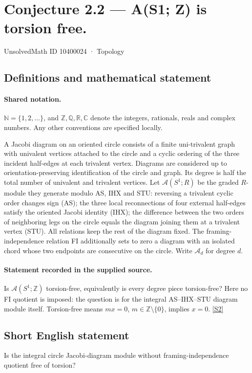 \documentclass[11pt]{article}
\newcommand{\sref}[2]{\hyperlink{source:#1:#2}{[S#2]}}
\begin{document}
\setcounter{section}{10400023}
\section{Conjecture 2.2 — A(S1; Z) is torsion free.}\label{10400024}
{\small\sffamily UnsolvedMath ID 10400024 · Topology}
\subsection{Definitions and mathematical statement}

\paragraph{Shared notation.}$\mathbb N=\{1,2,\ldots\}$, and $\mathbb Z,\mathbb Q,\mathbb R,\mathbb C$ denote the integers, rationals, reals and complex numbers. Any other conventions are specified locally.


A Jacobi diagram on an oriented circle consists of a finite uni-trivalent graph with univalent vertices attached to the circle and a cyclic ordering of the three incident half-edges at each trivalent vertex. Diagrams are considered up to orientation-preserving identification of the circle and graph. Its degree is half the total number of univalent and trivalent vertices. Let $\mathcal A(S^1;R)$ be the graded $R$-module they generate modulo AS, IHX and STU: reversing a trivalent cyclic order changes sign (AS); the three local reconnections of four external half-edges satisfy the oriented Jacobi identity (IHX); the difference between the two orders of neighboring legs on the circle equals the diagram joining them at a trivalent vertex (STU). All relations keep the rest of the diagram fixed. The framing-independence relation FI additionally sets to zero a diagram with an isolated chord whose two endpoints are consecutive on the circle. Write $\mathcal A_d$ for degree $d$.
\paragraph{Statement recorded in the supplied source.}
Is $\mathcal A(S^1;\mathbb Z)$ torsion-free, equivalently is every degree piece torsion-free? Here no FI quotient is imposed: the question is for the integral AS--IHX--STU diagram module itself. Torsion-free means $m x=0$, $m\in\mathbb Z\setminus\{0\}$, implies $x=0$. \sref{10400024}{2}
\subsection{Short English statement}
Is the integral circle Jacobi-diagram module without framing-independence quotient free of torsion?
\end{document}

